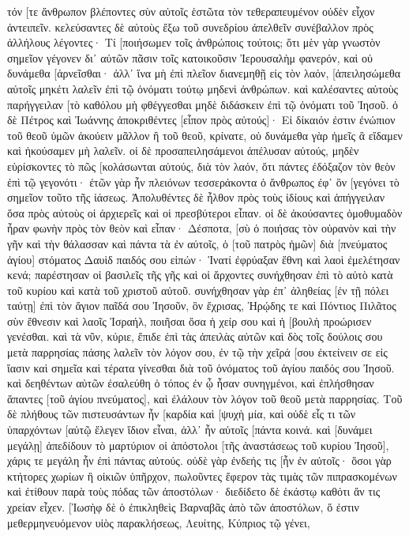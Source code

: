τόν [τε ἄνθρωπον βλέποντες σὺν αὐτοῖς ἑστῶτα τὸν τεθεραπευμένον οὐδὲν εἶχον ἀντειπεῖν. 
κελεύσαντες δὲ αὐτοὺς ἔξω τοῦ συνεδρίου ἀπελθεῖν συνέβαλλον πρὸς ἀλλήλους 
λέγοντες· Τί [ποιήσωμεν τοῖς ἀνθρώποις τούτοις; ὅτι μὲν γὰρ γνωστὸν σημεῖον γέγονεν δι᾽ αὐτῶν πᾶσιν τοῖς κατοικοῦσιν Ἰερουσαλὴμ φανερόν, καὶ οὐ δυνάμεθα [ἀρνεῖσθαι· 
ἀλλ᾽ ἵνα μὴ ἐπὶ πλεῖον διανεμηθῇ εἰς τὸν λαόν, [ἀπειλησώμεθα αὐτοῖς μηκέτι λαλεῖν ἐπὶ τῷ ὀνόματι τούτῳ μηδενὶ ἀνθρώπων. 
καὶ καλέσαντες αὐτοὺς παρήγγειλαν [τὸ καθόλου μὴ φθέγγεσθαι μηδὲ διδάσκειν ἐπὶ τῷ ὀνόματι τοῦ Ἰησοῦ. 
ὁ δὲ Πέτρος καὶ Ἰωάννης ἀποκριθέντες [εἶπον πρὸς αὐτούς]· Εἰ δίκαιόν ἐστιν ἐνώπιον τοῦ θεοῦ ὑμῶν ἀκούειν μᾶλλον ἢ τοῦ θεοῦ, κρίνατε, 
οὐ δυνάμεθα γὰρ ἡμεῖς ἃ εἴδαμεν καὶ ἠκούσαμεν μὴ λαλεῖν. 
οἱ δὲ προσαπειλησάμενοι ἀπέλυσαν αὐτούς, μηδὲν εὑρίσκοντες τὸ πῶς [κολάσωνται αὐτούς, διὰ τὸν λαόν, ὅτι πάντες ἐδόξαζον τὸν θεὸν ἐπὶ τῷ γεγονότι· 
ἐτῶν γὰρ ἦν πλειόνων τεσσεράκοντα ὁ ἄνθρωπος ἐφ᾽ ὃν [γεγόνει τὸ σημεῖον τοῦτο τῆς ἰάσεως. 
Ἀπολυθέντες δὲ ἦλθον πρὸς τοὺς ἰδίους καὶ ἀπήγγειλαν ὅσα πρὸς αὐτοὺς οἱ ἀρχιερεῖς καὶ οἱ πρεσβύτεροι εἶπαν. 
οἱ δὲ ἀκούσαντες ὁμοθυμαδὸν ἦραν φωνὴν πρὸς τὸν θεὸν καὶ εἶπαν· Δέσποτα, [σὺ ὁ ποιήσας τὸν οὐρανὸν καὶ τὴν γῆν καὶ τὴν θάλασσαν καὶ πάντα τὰ ἐν αὐτοῖς, 
ὁ [τοῦ πατρὸς ἡμῶν] διὰ [πνεύματος ἁγίου] στόματος Δαυὶδ παιδός σου εἰπών· Ἱνατί ἐφρύαξαν ἔθνη καὶ λαοὶ ἐμελέτησαν κενά; 
παρέστησαν οἱ βασιλεῖς τῆς γῆς καὶ οἱ ἄρχοντες συνήχθησαν ἐπὶ τὸ αὐτὸ κατὰ τοῦ κυρίου καὶ κατὰ τοῦ χριστοῦ αὐτοῦ. 
συνήχθησαν γὰρ ἐπ᾽ ἀληθείας [ἐν τῇ πόλει ταύτῃ] ἐπὶ τὸν ἅγιον παῖδά σου Ἰησοῦν, ὃν ἔχρισας, Ἡρῴδης τε καὶ Πόντιος Πιλᾶτος σὺν ἔθνεσιν καὶ λαοῖς Ἰσραήλ, 
ποιῆσαι ὅσα ἡ χείρ σου καὶ ἡ [βουλὴ προώρισεν γενέσθαι. 
καὶ τὰ νῦν, κύριε, ἔπιδε ἐπὶ τὰς ἀπειλὰς αὐτῶν καὶ δὸς τοῖς δούλοις σου μετὰ παρρησίας πάσης λαλεῖν τὸν λόγον σου, 
ἐν τῷ τὴν χεῖρά [σου ἐκτείνειν σε εἰς ἴασιν καὶ σημεῖα καὶ τέρατα γίνεσθαι διὰ τοῦ ὀνόματος τοῦ ἁγίου παιδός σου Ἰησοῦ. 
καὶ δεηθέντων αὐτῶν ἐσαλεύθη ὁ τόπος ἐν ᾧ ἦσαν συνηγμένοι, καὶ ἐπλήσθησαν ἅπαντες [τοῦ ἁγίου πνεύματος], καὶ ἐλάλουν τὸν λόγον τοῦ θεοῦ μετὰ παρρησίας. 
Τοῦ δὲ πλήθους τῶν πιστευσάντων ἦν [καρδία καὶ [ψυχὴ μία, καὶ οὐδὲ εἷς τι τῶν ὑπαρχόντων [αὐτῷ ἔλεγεν ἴδιον εἶναι, ἀλλ᾽ ἦν αὐτοῖς [πάντα κοινά. 
καὶ [δυνάμει μεγάλῃ] ἀπεδίδουν τὸ μαρτύριον οἱ ἀπόστολοι [τῆς ἀναστάσεως τοῦ κυρίου Ἰησοῦ], χάρις τε μεγάλη ἦν ἐπὶ πάντας αὐτούς. 
οὐδὲ γὰρ ἐνδεής τις [ἦν ἐν αὐτοῖς· ὅσοι γὰρ κτήτορες χωρίων ἢ οἰκιῶν ὑπῆρχον, πωλοῦντες ἔφερον τὰς τιμὰς τῶν πιπρασκομένων 
καὶ ἐτίθουν παρὰ τοὺς πόδας τῶν ἀποστόλων· διεδίδετο δὲ ἑκάστῳ καθότι ἄν τις χρείαν εἶχεν. 
[Ἰωσὴφ δὲ ὁ ἐπικληθεὶς Βαρναβᾶς ἀπὸ τῶν ἀποστόλων, ὅ ἐστιν μεθερμηνευόμενον υἱὸς παρακλήσεως, Λευίτης, Κύπριος τῷ γένει, 
